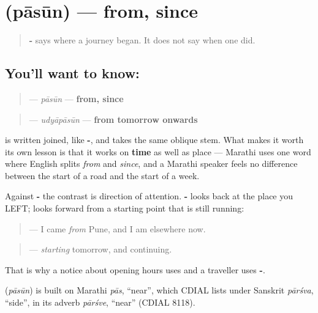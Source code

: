 \section[\texorpdfstring{\mr{पासून} (pāsūn)}{पासून (pāsūn)}]{ (pāsūn) — from, since}

\label{lesson:MR-C46-paasun}



\begin{quote}
\textbf{-} says where a journey began. It does not say when one did.
\end{quote}

\subsection*{You'll want to know: }
\begin{quote}
\textbf{} — \emph{pāsūn} — \textbf{from, since}
\end{quote}

\begin{quote}
\textbf{} — \emph{udyāpāsūn} — \textbf{from tomorrow onwards}
\end{quote}

\textbf{} is written joined, like \textbf{-}, and takes the same oblique stem. What makes it worth its own lesson is that it works on \textbf{time} as well as place — Marathi uses one word where English splits \emph{from} and \emph{since}, and a Marathi speaker feels no difference between the start of a road and the start of a week.

Against \textbf{-} the contrast is direction of attention. \textbf{-} looks back at the place you LEFT; \textbf{} looks forward from a starting point that is still running:

\begin{quote}
\textbf{} — I came \emph{from} Pune, and I am elsewhere now.
\end{quote}

\begin{quote}
\textbf{} — \emph{starting} tomorrow, and continuing.
\end{quote}

That is why a notice about opening hours uses \textbf{} and a traveller uses \textbf{-}.

\begin{cousinweb}
\textbf{} (\emph{pāsūn}) is built on Marathi \emph{pās}, \textquotedblleft{}near\textquotedblright{}, which CDIAL lists under Sanskrit \emph{pārśva}, \textquotedblleft{}side\textquotedblright{}, in its adverb \emph{pārśve}, \textquotedblleft{}near\textquotedblright{} (CDIAL 8118).
\end{cousinweb}

